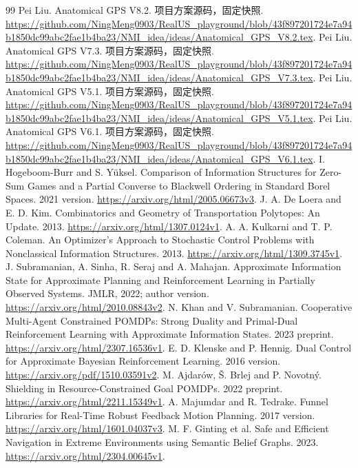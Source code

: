 \documentclass[UTF8,11pt,a4paper,fontset=fandol]{ctexart}
\numberwithin{equation}{section}
\theoremstyle{definition}
\begin{document}
\clearpage
\begin{thebibliography}{99}\small
{} Pei Liu. Anatomical GPS V8.2. 项目方案源码，固定快照. \url{https://github.com/NingMeng0903/RealUS_playground/blob/43f897201724e7a94b1850dc99abc2fae1b4ba23/NMI_idea/ideas/Anatomical_GPS_V8.2.tex}.
 Pei Liu. Anatomical GPS V7.3. 项目方案源码，固定快照. \url{https://github.com/NingMeng0903/RealUS_playground/blob/43f897201724e7a94b1850dc99abc2fae1b4ba23/NMI_idea/ideas/Anatomical_GPS_V7.3.tex}.
 Pei Liu. Anatomical GPS V5.1. 项目方案源码，固定快照. \url{https://github.com/NingMeng0903/RealUS_playground/blob/43f897201724e7a94b1850dc99abc2fae1b4ba23/NMI_idea/ideas/Anatomical_GPS_V5.1.tex}.
 Pei Liu. Anatomical GPS V6.1. 项目方案源码，固定快照. \url{https://github.com/NingMeng0903/RealUS_playground/blob/43f897201724e7a94b1850dc99abc2fae1b4ba23/NMI_idea/ideas/Anatomical_GPS_V6.1.tex}.
 I. Hogeboom-Burr and S. Y\"uksel. Comparison of Information Structures for Zero-Sum Games and a Partial Converse to Blackwell Ordering in Standard Borel Spaces. 2021 version. \url{https://arxiv.org/html/2005.06673v3}.
 J. A. De Loera and E. D. Kim. Combinatorics and Geometry of Transportation Polytopes: An Update. 2013. \url{https://arxiv.org/html/1307.0124v1}.
 A. A. Kulkarni and T. P. Coleman. An Optimizer's Approach to Stochastic Control Problems with Nonclassical Information Structures. 2013. \url{https://arxiv.org/html/1309.3745v1}.
 J. Subramanian, A. Sinha, R. Seraj and A. Mahajan. Approximate Information State for Approximate Planning and Reinforcement Learning in Partially Observed Systems. JMLR, 2022; author version. \url{https://arxiv.org/html/2010.08843v2}.
 N. Khan and V. Subramanian. Cooperative Multi-Agent Constrained POMDPs: Strong Duality and Primal-Dual Reinforcement Learning with Approximate Information States. 2023 preprint. \url{https://arxiv.org/html/2307.16536v1}.
 E. D. Klenske and P. Hennig. Dual Control for Approximate Bayesian Reinforcement Learning. 2016 version. \url{https://arxiv.org/pdf/1510.03591v2}.
 M. Ajdar\'ow, \v{S}. Brlej and P. Novotn\'y. Shielding in Resource-Constrained Goal POMDPs. 2022 preprint. \url{https://arxiv.org/html/2211.15349v1}.
 A. Majumdar and R. Tedrake. Funnel Libraries for Real-Time Robust Feedback Motion Planning. 2017 version. \url{https://arxiv.org/html/1601.04037v3}.
 M. F. Ginting et al. Safe and Efficient Navigation in Extreme Environments using Semantic Belief Graphs. 2023. \url{https://arxiv.org/html/2304.00645v1}.

\end{thebibliography}
\end{document}
